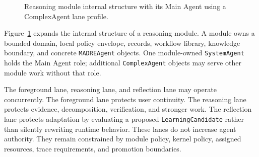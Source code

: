\documentclass[11pt]{report}
\begin{document}
\begin{figure}[H]
{%
	}
	\caption{Reasoning module internal structure with its Main Agent using a ComplexAgent lane profile.}
	\label{fig:madre-complex-agent-module}
\end{figure}

Figure~\ref{fig:madre-complex-agent-module} expands the internal structure of a reasoning module. A module owns a bounded domain, local policy envelope, records, workflow library, knowledge boundary, and concrete \texttt{MADREAgent} objects. One module-owned \texttt{SystemAgent} holds the Main Agent role; additional \texttt{ComplexAgent} objects may serve other module work without that role.

The foreground lane, reasoning lane, and reflection lane may operate concurrently. The foreground lane protects user continuity. The reasoning lane protects evidence, decomposition, verification, and stronger work. The reflection lane protects adaptation by evaluating a proposed \texttt{LearningCandidate} rather than silently rewriting runtime behavior. These lanes do not increase agent authority. They remain constrained by module policy, kernel policy, assigned resources, trace requirements, and promotion boundaries.
\end{document}
